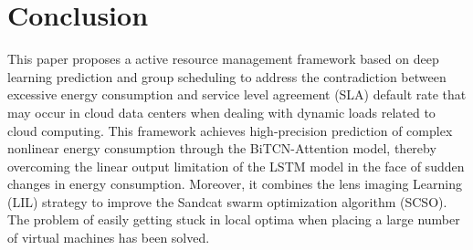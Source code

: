 \documentclass[conference]{{IEEEtran}}
\begin{document}
%



\section{Conclusion}

This paper proposes a  active resource management framework based on deep learning prediction and group scheduling to address the contradiction between excessive energy consumption and service level agreement (SLA) default rate that may occur in cloud data centers when dealing with dynamic loads related to cloud computing. This framework achieves high-precision prediction of complex nonlinear energy consumption through the BiTCN-Attention  model, thereby overcoming the linear output limitation of the LSTM model in the face of sudden changes in energy consumption. Moreover, it combines the lens imaging Learning (LIL) strategy to improve the Sandcat swarm optimization algorithm (SCSO). The problem of easily getting stuck in local optima when placing a large number of virtual machines has been solved.
\end{document}
